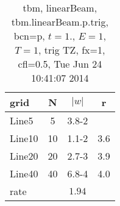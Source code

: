 \begin{table}[hbt]\tableFont %
\begin{center}
\begin{tabular}{|l|c|c|c|} \hline 
grid  & N &  $\vert w \vert$   & r \\ \hline 
               Line5 &     5 & \num{3.8}{-2} &       \\ \hline
              Line10 &    10 & \num{1.1}{-2} &  3.6  \\ \hline
              Line20 &    20 & \num{2.7}{-3} &  3.9  \\ \hline
              Line40 &    40 & \num{6.8}{-4} &  4.0  \\ \hline
    rate             &       &  $1.94$       &       \\ \hline
\end{tabular}
\caption{tbm, linearBeam, tbm.linearBeam.p.trig, bcn=p, $t=1.$, $E=1$, $T=1$,  trig TZ, fx=1, cfl=0.5, Tue Jun 24 10:41:07 2014}\label{table:tbm.linearBeam.p.trig}
\end{center}
\end{table}
